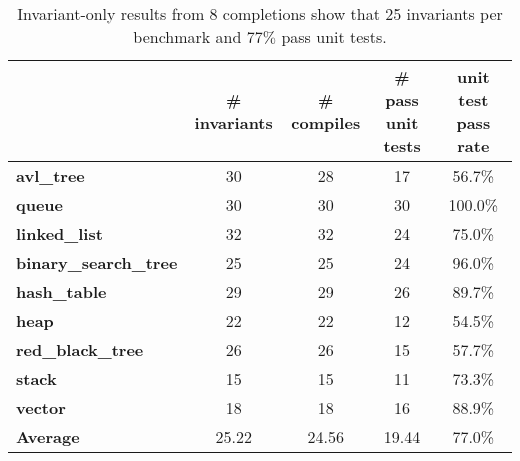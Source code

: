 \begin{table}[ht]
\centering
\small
\begin{tabular}{|l|c|c|c|c|}
\hline
\textbf{}           & \textbf{\# invariants} & \textbf{\# compiles} & \textbf{\# pass unit tests} & \textbf{unit test pass rate} \\ \hline
\textbf{avl\_tree}          & 30            & 28                  & 17                    & 56.7\%             \\ \hline
\textbf{queue}              & 30            & 30                  & 30                    & 100.0\%            \\ \hline
\textbf{linked\_list}       & 32            & 32                  & 24                    & 75.0\%             \\ \hline
\textbf{binary\_search\_tree} & 25            & 25                  & 24                    & 96.0\%             \\ \hline
\textbf{hash\_table}        & 29            & 29                  & 26                    & 89.7\%             \\ \hline
\textbf{heap}               & 22            & 22                  & 12                    & 54.5\%             \\ \hline
\textbf{red\_black\_tree}   & 26            & 26                  & 15                    & 57.7\%             \\ \hline
\textbf{stack}              & 15            & 15                  & 11                    & 73.3\%             \\ \hline
\textbf{vector}             & 18            & 18                  & 16                    & 88.9\%             \\ \hline
\textbf{Average}            & 25.22         & 24.56               & 19.44                 & 77.0\%             \\ \hline
\end{tabular}
\caption{ Invariant-only results from 8 completions show that 25 invariants per benchmark and $77\%$ pass unit tests. }
\label{ds_0shot}
\end{table}



